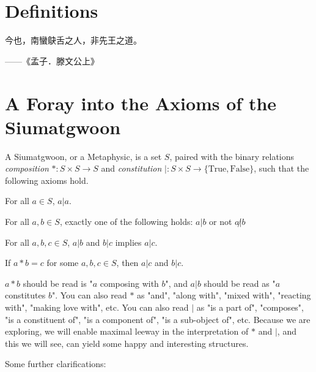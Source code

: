 \section{Definitions}

\epigraph{今也，南蠻鴃舌之人，非先王之道。}{——《孟子．滕文公上》}


\section{A Foray into the Axioms of the Siumatgwoon}


\begin{definition}[Siumatgwoon]\label{def:siumatgwoon}
    A Siumatgwoon, or a Metaphysic, is a set $S$, paired with the binary relations \textit{composition} $* : S \times S \rightarrow S$ and \textit{constitution} $|:S\times S \rightarrow \{\text{True}, \text{False}\}$, such that the following axioms hold. 

    \begin{axiom}[Reflexivity]\label{ax:reflex}
    For all $a \in S$, $a|a$.
    \end{axiom}

    \begin{axiom}[Totality]\label{ax:total}
    For all $a,b\in S$, exactly one of the following holds: $a|b$ or not $a\not|b$
    \end{axiom}

    \begin{axiom}[Transitivity]\label{ax:trans}
    For all $a,b,c\in S$, $a|b$ and $b|c$ implies $a|c$.
    \end{axiom}

    \begin{axiom}\label{ax:comp-const}
    If $a*b=c$ for some $a,b,c\in S$, then $a|c$ and $b|c$.
    \end{axiom}
\end{definition}

$a * b$ should be read is "$a$ composing with $b$", and $a | b$ should be read as "$a$ constitutes $b$". You can also read $*$ as "and", "along with", "mixed with", "reacting with", "making love with", etc. You can also read $|$ as "is a part of", "composes", "is a constituent of", "is a component of", "is a sub-object of", etc. Because we are exploring, we will enable maximal leeway in the interpretation of $*$ and $|$, and this we will see, can yield some happy and interesting structures. 

Some further clarifications: 

